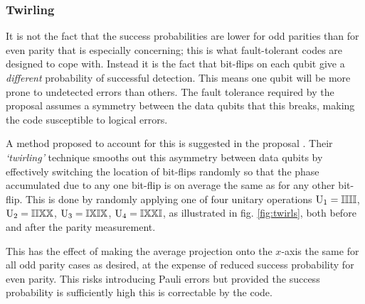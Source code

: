 
\subsubsection{Twirling}

It is not the fact that the success probabilities are lower for odd parities than for even parity that is especially concerning; this is what fault-tolerant codes are designed to cope with. Instead it is the fact that bit-flips on each qubit give a \emph{different} probability of successful detection. This means one qubit will be more prone to undetected errors than others. The fault tolerance required by the proposal assumes a symmetry between the data qubits that this breaks, making the code susceptible to logical errors.

A method proposed to account for this is suggested in the proposal \cite{OGorman2016}. Their \emph{`twirling'} technique smooths out this asymmetry between data qubits by effectively switching the location of bit-flips randomly so that the phase accumulated due to any one bit-flip is on average the same as for any other bit-flip. This is done by randomly applying one of four unitary operations $\mathrm{U_1 = \mathbb{I}\mathbb{I}\mathbb{I}\mathbb{I}}$, $\mathrm{U_2 = \mathbb{I}\mathbb{I}\mathbb{X}\mathbb{X}}$, $\mathrm{U_3 = \mathbb{I}\mathbb{X}\mathbb{I}\mathbb{X}}$, $\mathrm{U_4 = \mathbb{I}\mathbb{X}\mathbb{X}\mathbb{I}}$, as illustrated in fig. \ref{fig:twirls}, both before and after the parity measurement.

This has the effect of making the average projection onto the $x$-axis the same for all odd parity cases as desired, at the expense of reduced success probability for even parity. This risks introducing Pauli errors \cite{OGorman2016} but provided the success probability is sufficiently high this is correctable by the code.


